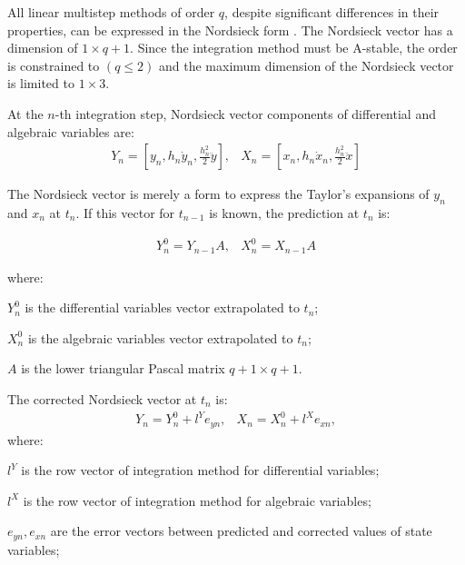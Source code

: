 \documentclass[lettersize,journal]{IEEEtran}
\begin{document}
All linear multistep methods of order \(q\), despite significant differences in their properties, can be expressed in the Nordsieck form \cite{hairer93}. The Nordsieck vector has a dimension of \(1 \times q+1\). Since the integration method must be A-stable, the order is constrained to \((q \leq 2)\) and the maximum dimension of the Nordsieck vector is limited to \(1 \times 3\). 

At the \(n\)-th integration step, Nordsieck vector components of differential and algebraic variables are:
\begin{equation}
	\label{eqn_nords}
	\begin{array}{cc}
		Y_n=\left[y_n, h_n \dot{y}_n, \frac{h_n^2}{2} \ddot{y}\right], &
		X_n=\left[x_n, h_n \dot{x}_n, \frac{h_n^2}{2} \ddot{x}\right] 
	\end{array}
\end{equation}

The Nordsieck vector is merely a form to express the Taylor's expansions of \(y_n\) and \(x_n\) at \(t_n\). If this vector for \(t_{n-1}\) is known, the prediction at \(t_n\) is:

\begin{equation}
	\label{eqn_predictor}
	\begin{array}{cc}
		Y_n^0=Y_{n-1}A, &
		X_n^0=X_{n-1}A
	\end{array}
\end{equation}

\noindent where:
\begin{description}
	\item  \(Y_n^0\) is the differential variables vector extrapolated to \(t_n\);
	\item  \(X_n^0\) is the algebraic variables vector extrapolated to \(t_n\);
	\item  \(A\) is the lower triangular Pascal matrix \(q+1 \times q+1\).
\end{description}

The corrected Nordsieck vector at \(t_n\) is: 
\begin{equation}
	\label{eqn_corrector}
	\begin{array}{cc}
		Y_n=Y_n^0 +l^Ye_{yn}, &
		X_n=X_n^0 +l^Xe_{xn},
	\end{array}
\end{equation}
\noindent where:
\begin{description}
	\item  \(l^Y\) is the row vector of integration method for differential variables;
	\item  \(l^X\) is the row vector of integration method for algebraic variables;
	\item  \(e_{yn}, e_{xn}\) are the error vectors between predicted and corrected values of state variables;
\end{description}
\end{document}
